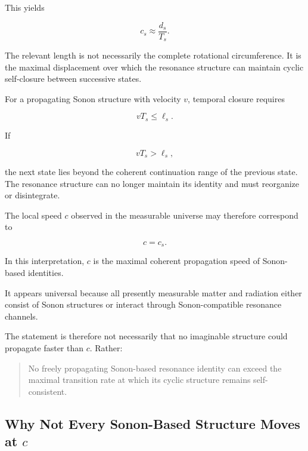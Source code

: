 \documentclass[11pt,a4paper]{article}
\begin{document}
This yields

\begin{equation}
    c_s
    \approx
    \frac{d_s}{T_s}.
\end{equation}

The relevant length is not necessarily the complete rotational circumference. It is the maximal displacement over which the resonance structure can maintain cyclic self-closure between successive states.

For a propagating Sonon structure with velocity $v$, temporal closure requires

\begin{equation}
    vT_s
    \leq
    \ell_s.
    \label{eq:sonon_coherence_condition}
\end{equation}

If

\begin{equation}
    vT_s > \ell_s,
\end{equation}

the next state lies beyond the coherent continuation range of the previous state. The resonance structure can no longer maintain its identity and must reorganize or disintegrate.

The local speed $c$ observed in the measurable universe may therefore correspond to

\begin{equation}
    c = c_s.
\end{equation}

In this interpretation, $c$ is the maximal coherent propagation speed of Sonon-based identities.

It appears universal because all presently measurable matter and radiation either consist of Sonon structures or interact through Sonon-compatible resonance channels.

The statement is therefore not necessarily that no imaginable structure could propagate faster than $c$. Rather:

\begin{quote}
No freely propagating Sonon-based resonance identity can exceed the maximal transition rate at which its cyclic structure remains self-consistent.
\end{quote}


\subsection{Why Not Every Sonon-Based Structure Moves at \(c\)}
\label{sec:structures_below_c}
\end{document}
